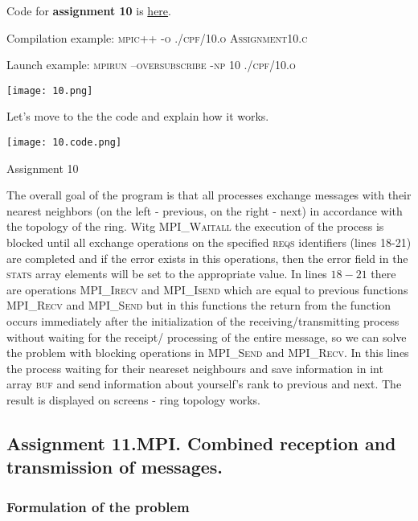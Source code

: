 \documentclass[%
12pt, %
final, %
oneside, %
onecolumn, %
centertags]{article} %
\theoremstyle{plain}
\theoremstyle{definition}
\theoremstyle{remark}
\begin{document}
Code for \textbf{assignment 10} is \href{https:\//github.com/aptmess/parallel_algorithms/blob/master/HT/hw_mpi/Assignment10.c}{here}.

Compilation example: \textsc{mpic++ -o ./cpf/10.o Assignment10.c}

Launch example: \textsc{mpirun --oversubscribe -np 10 ./cpf/10.o}

\begin{center}
\texttt{[image: 10.png]}
\end{center}

Let's move to the the code and explain how it works.

\begin{center}
\texttt{[image: 10.code.png]}

Assignment 10
\end{center}

The overall goal of the program is that all processes exchange messages with their nearest neighbors (on the left - previous, on the right - next) in accordance with the topology of the ring. Witg \textsc{MPI\_Waitall} the execution of the process is blocked until all exchange operations on the specified \textsc{reqs} identifiers (lines 18-21) are completed and if the error exists in this operations, then the error field in the \textsc{stats} array elements will be set to the appropriate value. In lines $18-21$ there are operations \textsc{MPI\_Irecv} and \textsc{MPI\_Isend} which are equal to previous functions \textsc{MPI\_Recv} and \textsc{MPI\_Send} but in this functions the return from the function occurs immediately after the initialization of the receiving/transmitting process without waiting for the receipt/ processing of the entire message, so we can solve the problem with blocking operations in \textsc{MPI\_Send} and \textsc{MPI\_Recv}. In this lines the process waiting for their neareset neighbours and save information in int array \textsc{buf} and send information about yourself's rank to previous and next. The result is displayed on screens - ring topology works.

\newpage
\subsection{Assignment 11.MPI. Combined reception and transmission of messages.}

\subsubsection{Formulation of the problem}
\end{document}
